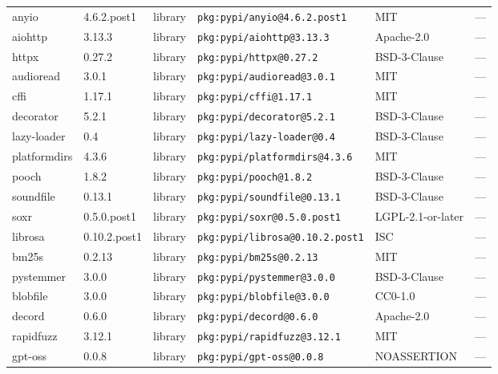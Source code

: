 \documentclass[11pt,a4paper]{article}
\begin{document}
\begin{longtable}{|p{4cm}|p{2cm}|p{1.6cm}|p{5cm}|p{1.5cm}|p{3.5cm}|}
\raggedright anyio & 4.6.2.post1 & library & \small\texttt{pkg:pypi/anyio@4.6.2.post1} & MIT & \small — \\
\raggedright aiohttp & 3.13.3 & library & \small\texttt{pkg:pypi/aiohttp@3.13.3} & Apache-2.0 & \small — \\
\raggedright httpx & 0.27.2 & library & \small\texttt{pkg:pypi/httpx@0.27.2} & BSD-3-Clause & \small — \\
\raggedright audioread & 3.0.1 & library & \small\texttt{pkg:pypi/audioread@3.0.1} & MIT & \small — \\
\raggedright cffi & 1.17.1 & library & \small\texttt{pkg:pypi/cffi@1.17.1} & MIT & \small — \\
\raggedright decorator & 5.2.1 & library & \small\texttt{pkg:pypi/decorator@5.2.1} & BSD-3-Clause & \small — \\
\raggedright lazy-loader & 0.4 & library & \small\texttt{pkg:pypi/lazy-loader@0.4} & BSD-3-Clause & \small — \\
\raggedright platformdirs & 4.3.6 & library & \small\texttt{pkg:pypi/platformdirs@4.3.6} & MIT & \small — \\
\raggedright pooch & 1.8.2 & library & \small\texttt{pkg:pypi/pooch@1.8.2} & BSD-3-Clause & \small — \\
\raggedright soundfile & 0.13.1 & library & \small\texttt{pkg:pypi/soundfile@0.13.1} & BSD-3-Clause & \small — \\
\raggedright soxr & 0.5.0.post1 & library & \small\texttt{pkg:pypi/soxr@0.5.0.post1} & LGPL-2.1-or-later & \small — \\
\raggedright librosa & 0.10.2.post1 & library & \small\texttt{pkg:pypi/librosa@0.10.2.post1} & ISC & \small — \\
\raggedright bm25s & 0.2.13 & library & \small\texttt{pkg:pypi/bm25s@0.2.13} & MIT & \small — \\
\raggedright pystemmer & 3.0.0 & library & \small\texttt{pkg:pypi/pystemmer@3.0.0} & BSD-3-Clause & \small — \\
\raggedright blobfile & 3.0.0 & library & \small\texttt{pkg:pypi/blobfile@3.0.0} & CC0-1.0 & \small — \\
\raggedright decord & 0.6.0 & library & \small\texttt{pkg:pypi/decord@0.6.0} & Apache-2.0 & \small — \\
\raggedright rapidfuzz & 3.12.1 & library & \small\texttt{pkg:pypi/rapidfuzz@3.12.1} & MIT & \small — \\
\raggedright gpt-oss & 0.0.8 & library & \small\texttt{pkg:pypi/gpt-oss@0.0.8} & NOASSERTION & \small — \\

\end{longtable}
\end{document}
